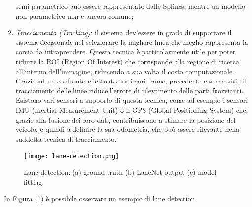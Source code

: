 \begin{enumerate}
    semi-parametrico può essere rappresentato dalle Splines, mentre un 
    modello non parametrico non è ancora comune;
    \item \emph{Tracciamento (Tracking)}: il sistema dev'essere in grado di supportare 
    il sistema decisionale nel selezionare la migliore linea che meglio rappresenta 
    la corsia da intraprendere. Questa tecnica è particolarmente 
    utile per poter ridurre la ROI (Region Of Interest) che corrisponde 
    alla regione di ricerca all'interno dell'immagine, riducendo a sua volta 
    il costo computazionale. Grazie ad un confronto effettuato tra i 
    vari frame, precedente e successivi, il tracciamento delle linee riduce 
    l'errore di rilevamento delle parti fuorvianti. Esistono vari sensori a 
    supporto di questa tecnica, come ad esempio i sensori IMU (Inertial 
    Measurement Unit) o il GPS (Global Positioning System) che, grazie alla fusione dei loro dati, 
    contribuiscono a stimare la posizione del veicolo, e quindi a definire 
    la sua odometria, che può essere rilevante nella suddetta tecnica di 
    tracciamento.
\end{enumerate}
\begin{figure}
    \centering
    \texttt{[image: lane-detection.png]}
    \centering
    \caption{Lane detection: (a) ground-truth (b) LaneNet \cite{LaneNet} output (c) model fitting.}
    \label{lane-det}
\end{figure}
In Figura (\ref{lane-det}) è possibile osservare un esempio di lane detection.

